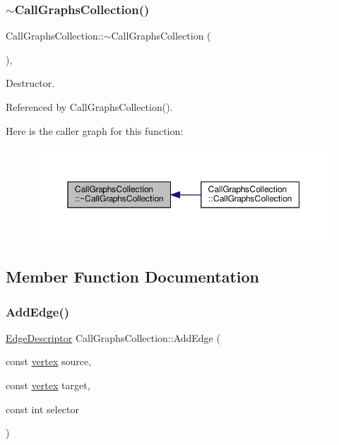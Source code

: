 \subsubsection{\texorpdfstring{$\sim$\+Call\+Graphs\+Collection()}{~CallGraphsCollection()}}
{\footnotesize\ttfamily Call\+Graphs\+Collection\+::$\sim$\+Call\+Graphs\+Collection (\begin{DoxyParamCaption}{ }\end{DoxyParamCaption})\hspace{0.3cm}{\ttfamily [override]}, {\ttfamily [default]}}



Destructor. 



Referenced by Call\+Graphs\+Collection().

Here is the caller graph for this function\+:
\nopagebreak
\begin{figure}[H]
\begin{center}
\leavevmode
\includegraphics[width=350pt]{d2/d82/classCallGraphsCollection_af8cacb85b589000d5ad2aa5f0a804489_icgraph}
\end{center}
\end{figure}


\subsection{Member Function Documentation}
\mbox{\label{classCallGraphsCollection_a8b58f9e18e88261160563162622a8148}} 
\subsubsection{\texorpdfstring{Add\+Edge()}{AddEdge()}}
{\footnotesize\ttfamily \hyperlink{graph_8hpp_a9eb9afea34e09f484b21f2efd263dd48}{Edge\+Descriptor} Call\+Graphs\+Collection\+::\+Add\+Edge (\begin{DoxyParamCaption}\item[{const \hyperlink{graph_8hpp_abefdcf0544e601805af44eca032cca14}{vertex}}]{source,  }\item[{const \hyperlink{graph_8hpp_abefdcf0544e601805af44eca032cca14}{vertex}}]{target,  }\item[{const int}]{selector }\end{DoxyParamCaption})\hspace{0.3cm}{\ttfamily [inline]}}



